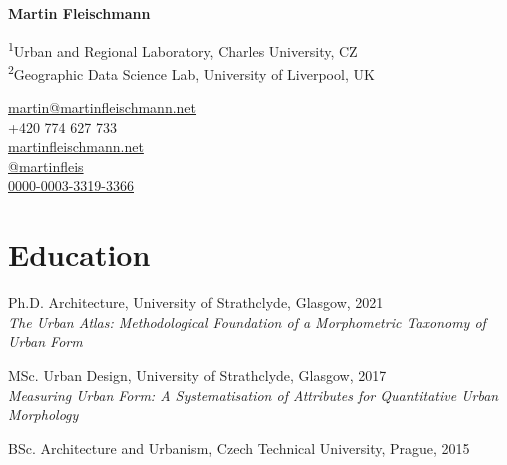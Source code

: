 \documentclass[12pt,a4paper]{report}
\newcommand{\myname}{Martin Fleischmann}
\newcommand{\namefont}[1]{{\normalfont\bfseries\Huge{#1}}}
\begin{document}
    \raggedright{}

    \namefont{\myname}

    \vspace{1em}

    \begin{minipage}[t]{0.6\textwidth}
        \begin{flushleft}
            \textsuperscript{1}Urban and Regional Laboratory, Charles University, CZ \\
            \textsuperscript{2}Geographic Data Science Lab, University of Liverpool, UK \\
        \end{flushleft}
    \end{minipage}%
    \begin{minipage}[t]{0.4\textwidth}
        \begin{flushright}
            \href{mailto:martin@martinfleischmann.net}{martin@martinfleischmann.net} \\
            +420 774 627 733 \\
            \href{https://martinfleischmann.net}{martinfleischmann.net} \\
            \href{https://x.com/martinfleis}{@martinfleis} \\
            \href{https://orcid.org/0000-0003-3319-3366}{0000-0003-3319-3366}
        \end{flushright}
    \end{minipage}%


    \section*{Education}

    \begin{tablist}

        \item[Ph.D.] \tab{}Architecture, University of Strathclyde, Glasgow, 2021 \\
                           \textit{The Urban Atlas: Methodological Foundation of a Morphometric Taxonomy of Urban Form}
        \item[MSc.]  \tab{}Urban Design, University of Strathclyde, Glasgow, 2017 \\
                           \textit{Measuring Urban Form: A Systematisation of Attributes for Quantitative Urban Morphology}
        \item[BSc.]  \tab{}Architecture and Urbanism, Czech Technical University, Prague, 2015

    \end{tablist}
\end{document}
